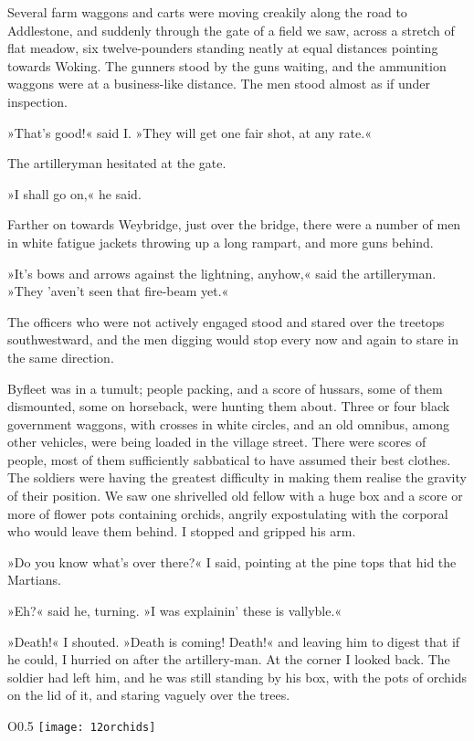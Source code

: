 Several farm waggons and carts were moving creakily along the road to Addlestone, and suddenly through the gate of a field we saw, across a stretch of flat meadow, six twelve-pounders standing neatly at equal distances pointing towards Woking. The gunners stood by the guns waiting, and the ammunition waggons were at a business-like distance. The men stood almost as if under inspection.

»That's good!« said I. »They will get one fair shot, at any rate.«

The artilleryman hesitated at the gate.

»I shall go on,« he said.

Farther on towards Weybridge, just over the bridge, there were a number of men in white fatigue jackets throwing up a long rampart, and more guns behind.

»It's bows and arrows against the lightning, anyhow,« said the artilleryman. »They 'aven't seen that fire-beam yet.«

The officers who were not actively engaged stood and stared over the treetops southwestward, and the men digging would stop every now and again to stare in the same direction.


Byfleet was in a tumult; people packing, and a score of hussars, some of them dismounted, some on horseback, were hunting them about. Three or four black government waggons, with crosses in white circles, and an old omnibus, among other vehicles, were being loaded in the village street. There were scores of people, most of them sufficiently sabbatical to have assumed their best clothes. The soldiers were having the greatest difficulty in making them realise the gravity of their position. We saw one shrivelled old fellow with a huge box and a score or more of flower pots containing orchids, angrily expostulating with the corporal who would leave them behind. I stopped and gripped his arm.

»Do you know what's over there?« I said, pointing at the pine tops that hid the Martians.

»Eh?« said he, turning. »I was explainin' these is vallyble.«

»Death!« I shouted. »Death is coming! Death!« and leaving him to digest that if he could, I hurried on after the artillery-man. At the corner I looked back. The soldier had left him, and he was still standing by his box, with the pots of orchids on the lid of it, and staring vaguely over the trees.

\begin{wrapfigure}{O}{0.5\textwidth}
\centering
\texttt{[image: 12orchids]}
\end{wrapfigure}

